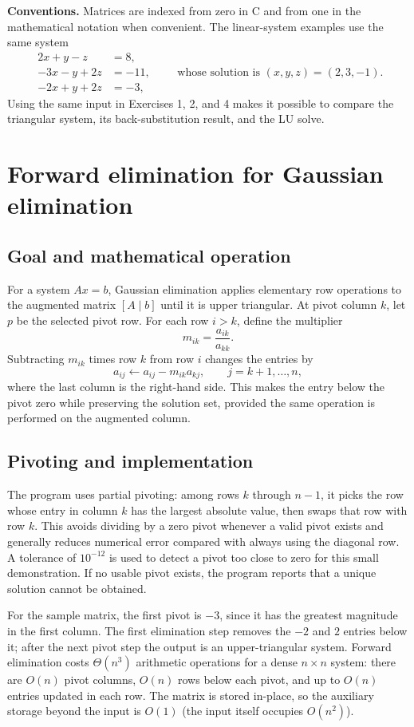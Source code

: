 \documentclass[12pt,a4paper]{article}
\theoremstyle{plain}
\theoremstyle{definition}
\theoremstyle{remark}
\begin{document}
\begin{infobox}
\textbf{Conventions.} Matrices are indexed from zero in C and from one in the mathematical notation when convenient. The linear-system examples use the same system
\[
\begin{aligned}
2x+y-z&=8,\\
-3x-y+2z&=-11,\\
-2x+y+2z&=-3,
\end{aligned}
\qquad\text{whose solution is }(x,y,z)=(2,3,-1).
\]
Using the same input in Exercises 1, 2, and 4 makes it possible to compare the triangular system, its back-substitution result, and the LU solve.
\end{infobox}

\section{Forward elimination for Gaussian elimination}
\subsection{Goal and mathematical operation}
For a system $Ax=b$, Gaussian elimination applies elementary row operations to the augmented matrix $[A\mid b]$ until it is upper triangular. At pivot column $k$, let $p$ be the selected pivot row. For each row $i>k$, define the multiplier
\[
m_{ik}=\frac{a_{ik}}{a_{kk}}.
\]
Subtracting $m_{ik}$ times row $k$ from row $i$ changes the entries by
\[
a_{ij}\leftarrow a_{ij}-m_{ik}a_{kj},\qquad j=k+1,\ldots,n,
\]
where the last column is the right-hand side. This makes the entry below the pivot zero while preserving the solution set, provided the same operation is performed on the augmented column.

\subsection{Pivoting and implementation}
The program uses partial pivoting: among rows $k$ through $n-1$, it picks the row whose entry in column $k$ has the largest absolute value, then swaps that row with row $k$. This avoids dividing by a zero pivot whenever a valid pivot exists and generally reduces numerical error compared with always using the diagonal row. A tolerance of $10^{-12}$ is used to detect a pivot too close to zero for this small demonstration. If no usable pivot exists, the program reports that a unique solution cannot be obtained.

For the sample matrix, the first pivot is $-3$, since it has the greatest magnitude in the first column. The first elimination step removes the $-2$ and $2$ entries below it; after the next pivot step the output is an upper-triangular system. Forward elimination costs $\Theta(n^3)$ arithmetic operations for a dense $n\times n$ system: there are $O(n)$ pivot columns, $O(n)$ rows below each pivot, and up to $O(n)$ entries updated in each row. The matrix is stored in-place, so the auxiliary storage beyond the input is $O(1)$ (the input itself occupies $O(n^2)$).
\end{document}
